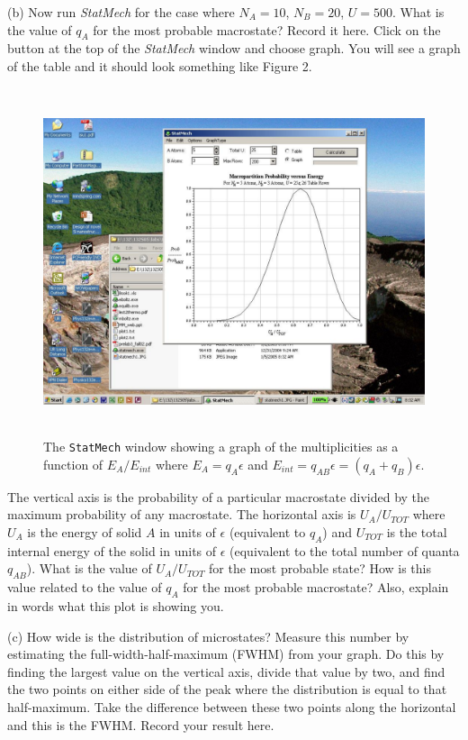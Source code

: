 (b) Now run {\it StatMech} for the case where $N_A = 10$, $N_B=20$, $U = 500$.
What is the value of $q_A$ for the most probable macrostate? 
Record it here.
Click on the button at the top of the {\it StatMech} window and choose graph.
You will see a graph of the table  and it should look something like
Figure 2.
\begin{figure}[!ht]
\begin{center}
\includegraphics[height=4.0in]{einstein_solid/statmech2.pdf}
\caption{The {\tt StatMech} window showing a graph of the multiplicities as a function
of $E_A/E_{int}$ where $E_A = q_A \epsilon$ and 
$E_{int} = q_{AB} \epsilon = (q_A+q_B)\epsilon$.}
\end{center}
\end{figure}
The vertical axis is the probability of a particular macrostate divided by the maximum
probability of any macrostate.
The horizontal axis is  $U_A/U_{TOT}$ where 
$U_A$ is the energy of solid $A$ in units of $\epsilon$ (equivalent to $q_A$) and $U_{TOT}$ is the total
internal energy of the solid in units of $\epsilon$ (equivalent 
to the total number of quanta $q_{AB}$).
What is the value of $U_A/U_{TOT}$ for the most probable state?
How is this value related to the value of $q_A$ for the most probable macrostate? 
Also, explain in words what this plot is showing you.
\answerspace{25mm}

(c) How wide is the distribution of microstates?
Measure this number by estimating the full-width-half-maximum (FWHM) from your graph.
Do this by finding the largest value on the vertical axis, divide that value by two, and find
the two points on either side of the peak where the distribution is equal to that
half-maximum.
Take the difference between these two points along the horizontal and this is the FWHM.
Record your result here.
\answerspace{20mm}

